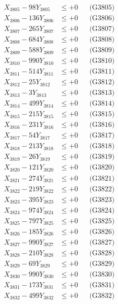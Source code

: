 \documentclass[a4paper,10pt]{article}
\begin{document}
{\begin{align}
X_{3805} - 98Y_{3805} &\leq +0 && \text{(G3805)} \\
X_{3806} - 136Y_{3806} &\leq +0 && \text{(G3806)} \\
X_{3807} - 265Y_{3807} &\leq +0 && \text{(G3807)} \\
X_{3808} - 684Y_{3808} &\leq +0 && \text{(G3808)} \\
X_{3809} - 588Y_{3809} &\leq +0 && \text{(G3809)} \\
X_{3810} - 990Y_{3810} &\leq +0 && \text{(G3810)} \\
\allowbreak
X_{3811} - 514Y_{3811} &\leq +0 && \text{(G3811)} \\
X_{3812} - 25Y_{3812} &\leq +0 && \text{(G3812)} \\
X_{3813} - 3Y_{3813} &\leq +0 && \text{(G3813)} \\
X_{3814} - 499Y_{3814} &\leq +0 && \text{(G3814)} \\
X_{3815} - 215Y_{3815} &\leq +0 && \text{(G3815)} \\
X_{3816} - 231Y_{3816} &\leq +0 && \text{(G3816)} \\
X_{3817} - 54Y_{3817} &\leq +0 && \text{(G3817)} \\
X_{3818} - 213Y_{3818} &\leq +0 && \text{(G3818)} \\
X_{3819} - 26Y_{3819} &\leq +0 && \text{(G3819)} \\
X_{3820} - 121Y_{3820} &\leq +0 && \text{(G3820)} \\
\allowbreak
X_{3821} - 274Y_{3821} &\leq +0 && \text{(G3821)} \\
X_{3822} - 219Y_{3822} &\leq +0 && \text{(G3822)} \\
X_{3823} - 395Y_{3823} &\leq +0 && \text{(G3823)} \\
X_{3824} - 974Y_{3824} &\leq +0 && \text{(G3824)} \\
X_{3825} - 797Y_{3825} &\leq +0 && \text{(G3825)} \\
X_{3826} - 185Y_{3826} &\leq +0 && \text{(G3826)} \\
X_{3827} - 990Y_{3827} &\leq +0 && \text{(G3827)} \\
X_{3828} - 210Y_{3828} &\leq +0 && \text{(G3828)} \\
X_{3829} - 69Y_{3829} &\leq +0 && \text{(G3829)} \\
X_{3830} - 990Y_{3830} &\leq +0 && \text{(G3830)} \\
\allowbreak
X_{3831} - 173Y_{3831} &\leq +0 && \text{(G3831)} \\
X_{3832} - 499Y_{3832} &\leq +0 && \text{(G3832)} \\

\end{align}}
\end{document}
